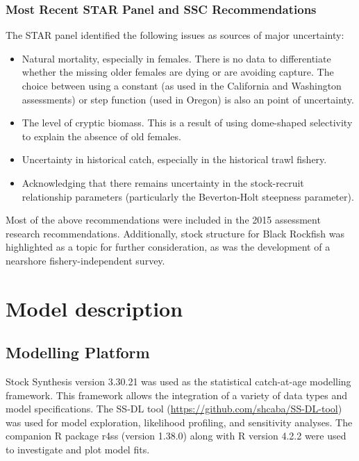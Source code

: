 \documentclass[11pt,
  english,
  letterpaper,
]{article}
\providecommand{\tightlist}{%
  \setlength{\itemsep}{0pt}\setlength{\parskip}{0pt}}
\providecommand{\tightlist}{%
  \setlength{\itemsep}{0pt}\setlength{\parskip}{0pt}}
\begin{document}
\hypertarget{most-recent-star-panel-and-ssc-recommendations}{%
\subsubsection{Most Recent STAR Panel and SSC Recommendations}\label{most-recent-star-panel-and-ssc-recommendations}}

The STAR panel identified the following issues as sources of major uncertainty:

\begin{itemize}
\tightlist
\item
  Natural mortality, especially in females. There is no data to differentiate whether the missing older females are dying or are avoiding capture. The choice between using a constant (as used in the California and Washington assessments) or step function (used in Oregon) is also an point of uncertainty.
\item
  The level of cryptic biomass. This is a result of using dome-shaped selectivity to explain the absence of old females.
\item
  Uncertainty in historical catch, especially in the historical trawl fishery.
\item
  Acknowledging that there remains uncertainty in the stock-recruit relationship parameters (particularly the Beverton-Holt steepness parameter).
\end{itemize}

Most of the above recommendations were included in the 2015 assessment research recommendations. Additionally, stock structure for Black Rockfish was highlighted as a topic for further consideration, as was the development of a nearshore fishery-independent survey.

\hypertarget{model-description}{%
\section{Model description}\label{model-description}}

\hypertarget{modelling-platform}{%
\subsection{Modelling Platform}\label{modelling-platform}}

Stock Synthesis version 3.30.21 was used as the statistical catch-at-age modelling framework. This framework allows the integration of a variety of data types and model specifications. The SS-DL tool (\url{https://github.com/shcaba/SS-DL-tool}) was used for model exploration, likelihood profiling, and sensitivity analyses. The companion R package r4ss (version 1.38.0) along with R version 4.2.2 were used to investigate and plot model fits.
\end{document}
